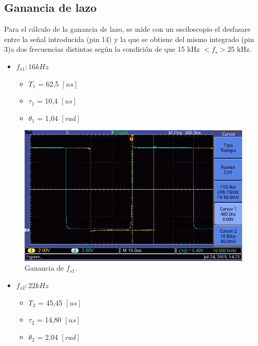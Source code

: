 \documentclass[twocolumn]{article}
\begin{document}
\subsection{Ganancia de lazo}
Para el cálculo de la ganancia de lazo, se mide con un osciloscopio el desfasare entre la señal introducida (pin 14) y la que se obtiene del mismo integrado (pin 3)a dos frecuencias distintas según la condición de que 15 kHz $< f_s > $25 kHz.

\begin{itemize}
	\item \textbf{$f_{s1}: 16 kHz$}
	  \begin{itemize}
		  \item $T_1$ = 62,5 $[us]$
		  \item $\tau_1$ = 10,4 $[us]$
		  \item $\theta_1$ = 1,04 $[rad]$ 
	  \end{itemize}
\end{itemize}


\begin{figure}[H]
  \centering    
  \includegraphics[width=\columnwidth]{imagenes/osc1.jpg}
  \caption{Ganancia de $f_{s1}$.}\label{fig:osc1}
\end{figure}

\begin{itemize}[*]
	\item \textbf{$f_{s2}: 22 kHz$}
	  \begin{itemize}
		  \item $T_2$ = 45,45 $[us]$
		  \item $\tau_2$ = 14,80 $[us]$
		  \item $\theta_2$ = 2,04  $[rad]$
	  \end{itemize}
\end{itemize}
\end{document}
